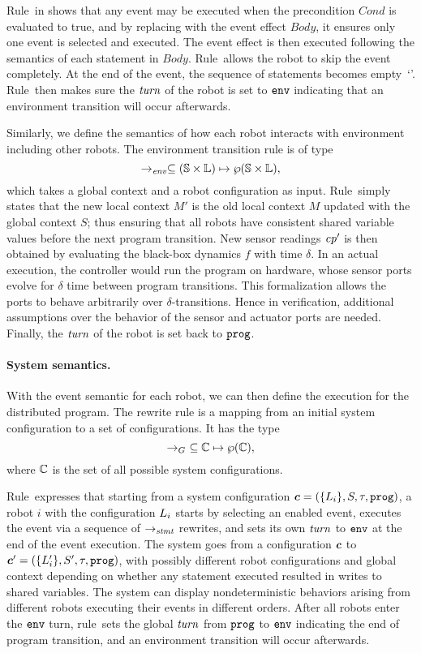 Rule~\SelectEventRule in  shows that any event may be executed when the precondition $Cond$ is evaluated to true,
and by replacing \SelectEvent with the event effect $\mathit{Body}$, it ensures only one event is selected and executed.
The event effect is then executed following the semantics of each statement in $\mathit{Body}$.
Rule~\SkipEventRule allows the robot to skip the event completely.
At the end of the event, the sequence of statements becomes empty~`\EndEvent'.
Rule~\EndEventRule then makes sure the $\mathit{turn}$ of the robot is set to $\mathtt{env}$ indicating that
an environment transition will occur afterwards.

Similarly, we define the semantics of how each robot interacts with environment including other robots.
The environment transition rule is of type
\[
\rightarrow_\mathit{env} \subseteq (\mathbb{S} \times \mathbb{L}) \mapsto \wp(\mathbb{S}\times \mathbb{L}),
\]
which takes a global context and a robot configuration as input.
Rule~\RobotEnvRule simply states that the new local context $M'$ is the
old local context $M$ updated with the global context $S$;
thus ensuring that all robots have consistent shared variable values before the next program transition.
New sensor readings $\mathit{cp}'$ is then obtained by evaluating the black-box dynamics $f$ with time $\delta$.
In an actual execution, the controller would run the program on hardware,
whose sensor ports evolve for $\delta$ time between program transitions.
This formalization allows the ports to behave arbitrarily over $\delta$-transitions.
Hence in verification,
additional assumptions over the behavior of the sensor and actuator ports are needed.
Finally, the $\mathit{turn}$ of the robot is set back to $\mathtt{prog}$.


\paragraph{System semantics.}

With the event semantic for each robot, we can then define the execution for the distributed \lgname program.
The rewrite rule is a mapping from an initial system configuration to a set of configurations.
It has the type
\[
\rightarrow_G\ \subseteq \mathbb{C} \mapsto \wp(\mathbb{C}),
\]
where $\mathbb{C}$ is the set of all possible system configurations.

Rule~\EventTransRule expresses that starting from a system configuration $\mathit{\boldsymbol{c}} = (\{L_{i}\}, S, \tau, \mathtt{prog})$,
a robot $i$ with the configuration $L_{i}$ starts by selecting an enabled event,
executes the event via a sequence of $\rightarrow_\mathit{stmt}$ rewrites,
and sets its own $\mathit{turn}$ to $\mathtt{env}$ at the end of the event execution.
The system goes from a configuration $\mathit{\boldsymbol{c}}$ to $\mathit{\boldsymbol{c}}^{\prime}= (\{L_{i}^\prime\}, S^{\prime}, \tau, \mathtt{prog})$,
with possibly different robot configurations and global context depending on
whether any statement executed resulted in writes to shared variables.
The system can display nondeterministic behaviors arising from different robots executing their events in different orders.
After all robots enter the $\mathtt{env}$ turn, rule~\EndProgTransRule sets the global $\mathit{turn}$ from $\mathtt{prog}$ to $\mathtt{env}$
indicating the end of program transition, and an environment transition will occur afterwards.

